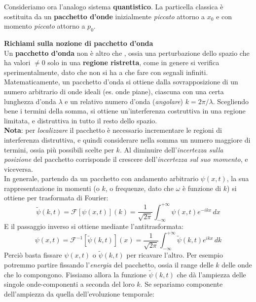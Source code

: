 \documentclass[../../FisicaTeorica.tex]{subfiles}
\begin{document}
\begin{center}

\end{center}
Consideriamo ora l'analogo sistema \textbf{quantistico}. 
La particella classica è sostituita da un \textbf{pacchetto d'onde} inizialmente \textit{piccato} attorno a $x_0$ e con momento \textit{piccato} attorno a $p_0$.\\
\begin{expl}
\textbf{Richiami sulla nozione di pacchetto d'onda}\\
Un \textbf{pacchetto d'onda} non è altro che , ossia una perturbazione dello spazio che ha valori $\neq 0$ solo in una \textbf{regione ristretta}, come in genere si verifica sperimentalmente, dato che non si ha a che fare con segnali infiniti.\\
Matematicamente, un pacchetto d'onda si ottiene dalla sovrapposizione di un numero arbitrario di onde ideali (es. onde piane), ciascuna con una certa lunghezza d'onda $\lambda$ e un relativo numero d'onda (\textit{angolare}) $k = 2\pi/\lambda$. Scegliendo bene i termini della somma, si ottiene un'interferenza costruttiva in una regione limitata, e distruttiva in tutto il resto dello spazio.\\
\textbf{Nota}: per \textit{localizzare} il pacchetto è necessario incrementare le regioni di interferenza distruttiva, e quindi considerare nella somma un numero maggiore di termini, ossia più possibili scelte per $k$. Al diminuire dell'\textit{incertezza sulla posizione} del pacchetto corrisponde il crescere dell'\textit{incertezza sul suo momento}, e viceversa.\\
In generale, partendo da un pacchetto con andamento arbitrario $\psi(x,t)$, la sua rappresentazione in momenti (o $k$, o frequenze, dato che $\omega$ è funzione di $k$) si ottiene per trasformata di Fourier:
\[
\tilde{\psi}(k,t)=\mathcal{F}[\psi(x,t)](k)=\frac{1}{\sqrt{2\pi}}\int_{-\infty}^{+\infty}
\psi(x,t) e^{-ikx}\,dx
\]
E il passaggio inverso si ottiene mediante l'antitrasformata:
\[
\psi(x,t)=\mathcal{F}^{-1}[\tilde{\psi}(k,t)](x)=\frac{1}{\sqrt{2\pi}}\int_{-\infty}^{+\infty}\tilde{\psi}(k,t)e^{ikx}\,dk
\]
Perciò basta fissare $\psi(x,t)$ o $\tilde{\psi}(k,t)$ per ricavare l'altro. Per esempio potremmo partire fissando l'\textit{energia} del pacchetto, ossia il range delle $k$ delle onde che lo compongono. Fissiamo allora la funzione $\tilde{\psi}(k,t)$ che dà l'ampiezza delle singole onde-componenti a seconda del loro $k$. Se separiamo componente dell'ampiezza da quella dell'evoluzione temporale:

\end{expl}
\end{document}
